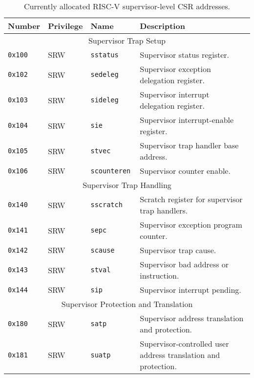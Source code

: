 \begin{table}[htb!]
\begin{center}
\begin{tabular}{|l|l|l|l|}
\hline
Number    & Privilege & Name & Description \\
\hline  
\multicolumn{4}{|c|}{Supervisor Trap Setup} \\
\hline
\tt 0x100 & SRW  &\tt sstatus    & Supervisor status register. \\
\tt 0x102 & SRW  &\tt sedeleg    & Supervisor exception delegation register. \\
\tt 0x103 & SRW  &\tt sideleg    & Supervisor interrupt delegation register. \\
\tt 0x104 & SRW  &\tt sie        & Supervisor interrupt-enable register. \\
\tt 0x105 & SRW  &\tt stvec      & Supervisor trap handler base address. \\
\tt 0x106 & SRW  &\tt scounteren & Supervisor counter enable. \\
\hline
\multicolumn{4}{|c|}{Supervisor Trap Handling} \\
\hline
\tt 0x140 & SRW  &\tt sscratch   & Scratch register for supervisor trap handlers. \\
\tt 0x141 & SRW  &\tt sepc       & Supervisor exception program counter. \\
\tt 0x142 & SRW  &\tt scause     & Supervisor trap cause. \\
\tt 0x143 & SRW  &\tt stval      & Supervisor bad address or instruction. \\
\tt 0x144 & SRW  &\tt sip        & Supervisor interrupt pending. \\
\hline
\multicolumn{4}{|c|}{Supervisor Protection and Translation} \\
\hline
\tt 0x180 & SRW  &\tt satp       & Supervisor address translation and protection. \\
\tt 0x181 & SRW  &\tt suatp      & Supervisor-controlled user address translation and protection. \\
\hline
\end{tabular}
\end{center}
\caption{Currently allocated RISC-V supervisor-level CSR addresses.}
\label{scsrnames}
\end{table}

